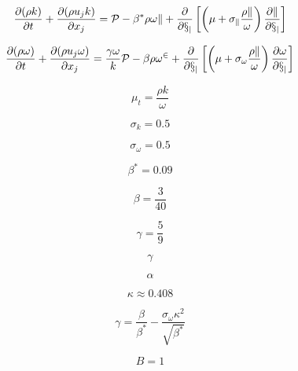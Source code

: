 

\begin{equation}
\frac{\partial (\rho k)}{\partial t} + \frac{\partial (\rho u_j k)}{\partial x_j}
  = \cal P - \beta^* \rho \omega k  + \frac{\partial}{\partial x_j}
  \left[\left(\mu + \sigma_k \frac{\rho k}{\omega} \right)\frac{\partial k}{\partial x_j}\right]
\end{equation}

\begin{equation}
\frac{\partial (\rho \omega)}{\partial t} + \frac{\partial (\rho u_j \omega)}{\partial x_j}
  = \frac{\gamma \omega}{k} \cal P -
  \beta \rho \omega^2 + \frac{\partial}{\partial x_j}
  \left[ \left( \mu + \sigma_{\omega} \frac{\rho k}{\omega} \right)
  \frac{\partial \omega}{\partial x_j} \right]
\end{equation}

\begin{equation}
\mu_t = \frac{\rho k}{\omega}
\end{equation}

\begin{equation}
\sigma_k = 0.5
\end{equation}

\begin{equation}
\sigma_{\omega} = 0.5
\end{equation}

\begin{equation}
\beta^* = 0.09
\end{equation}

\begin{equation}
\beta = \frac{3}{40}
\end{equation}

\begin{equation}
\gamma = \frac{5}{9}
\end{equation}

\begin{equation}
\gamma
\end{equation}

\begin{equation}
\alpha
\end{equation}

\begin{equation}
\kappa \approx 0.408
\end{equation}

\begin{equation}
\gamma = \frac{\beta}{\beta^*} - \frac{\sigma_{\omega} \kappa^2}{\sqrt{\beta^*}}
\end{equation}

\begin{equation}
B=1
\end{equation}


